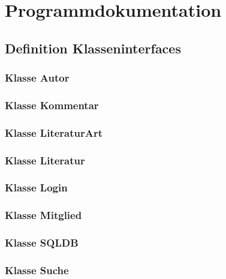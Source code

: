 \chapter{Programmdokumentation}
\section{Definition Klasseninterfaces}
\subsection{Klasse Autor}


\subsection{Klasse Kommentar}


\subsection{Klasse LiteraturArt}


\subsection{Klasse Literatur}


\subsection{Klasse Login}


\subsection{Klasse Mitglied}


\subsection{Klasse SQLDB}


\subsection{Klasse Suche}





